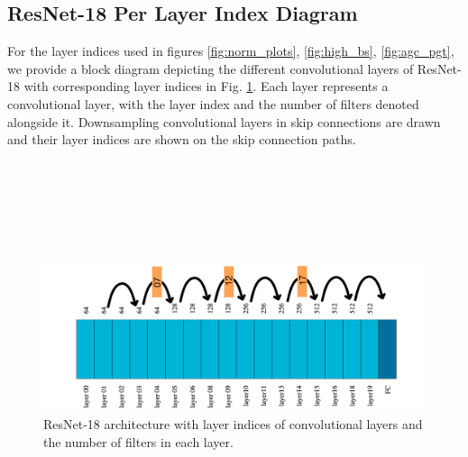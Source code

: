 \documentclass[times,sort&compress]{elsarticle}
\begin{document}
\newpage \subsection{ResNet-18 Per Layer Index Diagram}

For the layer indices used in figures \ref{fig:norm_plots}, \ref{fig:high_bs},
\ref{fig:agc_pgt}, we provide a block diagram depicting the different convolutional
layers of ResNet-18 with corresponding layer indices in Fig. \ref{fig:resnet18}. Each
layer represents a convolutional layer, with the layer index and the number of filters
denoted alongside it. Downsampling convolutional layers in skip connections are drawn
and their layer indices are shown on the skip connection paths.

\ \\ \ \\ \ \\ \ \\ \ \\ 

\begin{figure}[h] \centering \includegraphics[width=0.96\columnwidth]{drawing} \caption{
ResNet-18 architecture with layer indices of convolutional layers and the number of
filters in each layer. } \label{fig:resnet18} \end{figure}
\end{document}
